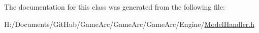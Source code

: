 The documentation for this class was generated from the following file\+:\begin{DoxyCompactItemize}
\item 
H\+:/\+Documents/\+Git\+Hub/\+Game\+Arc/\+Game\+Arc/\+Game\+Arc/\+Engine/\hyperlink{_model_handler_8h}{Model\+Handler.\+h}\end{DoxyCompactItemize}
